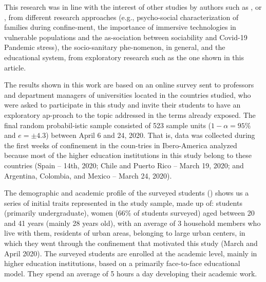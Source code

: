 \documentclass[english]{textolivre}
\begin{document}
This research was in line with the interest of other studies by authors such as \textcite{newbutt_possibility_2020}, \textcite{saez-delgado_caracterizacion_2020} or \textcite{luo_association_2022}, from different research approaches (e.g., psycho-social characterization of families during confine-ment, the importance of immersive technologies in vulnerable populations and the as-sociation between sociability and Covid-19 Pandemic stress), the socio-sanitary phe-nomenon, in general, and the educational system, from exploratory research such as the one shown in this article.

The results shown in this work are based on an online survey sent to professors and department managers of universities located in the countries studied, who were asked to participate in this study and invite their students to have an exploratory ap-proach to the topic addressed in the terms already exposed. The final random probabil-istic sample consisted of 523 sample units ($1-\alpha=95\%$ and $e=\pm 4.3$) between April 6 and 24, 2020. That is, data was collected during the first weeks of confinement in the coun-tries in Ibero-America analyzed because most of the higher education institutions in this study belong to these countries (Spain – 14th, 2020; Chile and Puerto Rico – March 19, 2020; and Argentina, Colombia, and Mexico – March 24, 2020).

The demographic and academic profile of the surveyed students () shows us a series of initial traits represented in the study sample, made up of: students (primarily undergraduate), women (66\% of students surveyed) aged between 20 and 41 years (mainly 28 years old), with an average of 3 household members who live with them, residents of urban areas, belonging to large urban centers, in which they went through the confinement that motivated this study (March and April 2020). The surveyed students are enrolled at the academic level, mainly in higher education institutions, based on a primarily face-to-face educational model. They spend an average of 5 hours a day developing their academic work.
\end{document}
